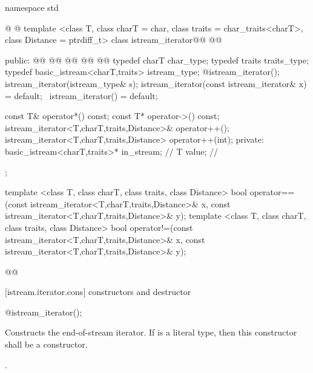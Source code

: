 \begin{codeblock}
namespace std { @ @
  template <class T, class charT = char, class traits = char_traits<charT>,
      class Distance = ptrdiff_t>
  class istream_iterator@\removed{:}@
    @@ {
  public:
    @@
    @@
    @@
    @@
    @@
    typedef charT char_type;
    typedef traits traits_type;
    typedef basic_istream<charT,traits> istream_type;
    @\seebelow@ istream_iterator();
    istream_iterator(istream_type& s);
    istream_iterator(const istream_iterator& x) = default;
   ~istream_iterator() = default;

    const T& operator*() const;
    const T* operator->() const;
    istream_iterator<T,charT,traits,Distance>& operator++();
    istream_iterator<T,charT,traits,Distance>  operator++(int);
  private:
    basic_istream<charT,traits>* in_stream; // \expos
    T value;                                // \expos
  };

  template <class T, class charT, class traits, class Distance>
    bool operator==(const istream_iterator<T,charT,traits,Distance>& x,
            const istream_iterator<T,charT,traits,Distance>& y);
  template <class T, class charT, class traits, class Distance>
    bool operator!=(const istream_iterator<T,charT,traits,Distance>& x,
            const istream_iterator<T,charT,traits,Distance>& y);
}@\added{\}\}}\newtxt{\}}@
\end{codeblock}

[istream.iterator.cons]{ constructors and destructor}


%
\begin{itemdecl}
@\seebelow@ istream_iterator();
\end{itemdecl}

\begin{itemdescr}
\pnum
\effects
Constructs the end-of-stream iterator. If  is a literal type, then this
constructor shall be a  constructor.

\pnum
\postcondition {}.
\end{itemdescr}


